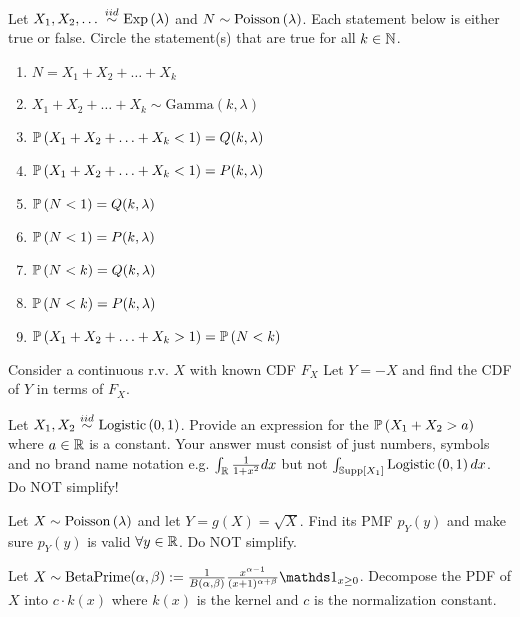 \documentclass[12pt]{article}
\begin{document}
 Let $X_1, X_2, \ldots \iid \exponential{\lambda}$ and $N \sim \mathrm{Poisson}\left(\lambda\right)$. Each statement below is either true or false. Circle the statement(s) that are true for all $k \in \mathbb{N}$.

\begin{enumerate}
\item $N = X_1 + X_2 + \ldots + X_k$
\item $X_1 + X_2 + \ldots + X_k \sim \text{Gamma}(k, \lambda)$
\item $\mathbb{P}\left(X_1 + X_2 + \ldots + X_k < 1\right) = Q(k, \lambda)$
\item $\mathbb{P}\left(X_1 + X_2 + \ldots + X_k < 1\right) = P(k, \lambda)$
\item $\mathbb{P}\left(N < 1\right) = Q(k, \lambda)$
\item $\mathbb{P}\left(N < 1\right) = P(k, \lambda)$
\item $\mathbb{P}\left(N < k\right) = Q(k, \lambda)$
\item $\mathbb{P}\left(N < k\right) = P(k, \lambda)$
\item $\mathbb{P}\left(X_1 + X_2 + \ldots + X_k > 1\right) = \mathbb{P}\left(N < k\right)$
\end{enumerate}




 Consider a continuous r.v. $X$ with known CDF $F_X$ Let $Y = -X$ and find the CDF of $Y$ in terms of $F_X$.  

 Let $X_1, X_2 \iid \text{Logistic}\parens{0, 1}$. Provide an expression for the $\mathbb{P}\left(X_1 + X_2 > a\right)$ where $a \in \mathbb{R}$ is a constant. Your answer must consist of just numbers, symbols and no brand name notation e.g. $\int_{\mathbb{R}} \frac{1}{1 + x^2} dx$ but not  $\int_{\mathbb{S}\text{upp}\left[X_1\right]} \text{Logistic}\left(0, 1\right) dx$. Do NOT simplify! 




 Let $X \sim \mathrm{Poisson}\left(\lambda\right)$ and let $Y = g(X) = \sqrt{X}$. Find its PMF $p_Y(y)$ and make sure $p_Y(y)$ is valid $\forall y \in \mathbb{R}$. Do NOT simplify. 

 Let $X \sim \text{BetaPrime}(\alpha, \beta) := \oneover{B(\alpha, \beta)} \frac{x^{\alpha - 1}}{(x + 1)^{\alpha + \beta}} \indic{x \geq 0}$. Decompose the PDF of $X$ into $c \cdot k(x)$ where $k(x)$ is the kernel and $c$ is the normalization constant. 
%
\end{document}
